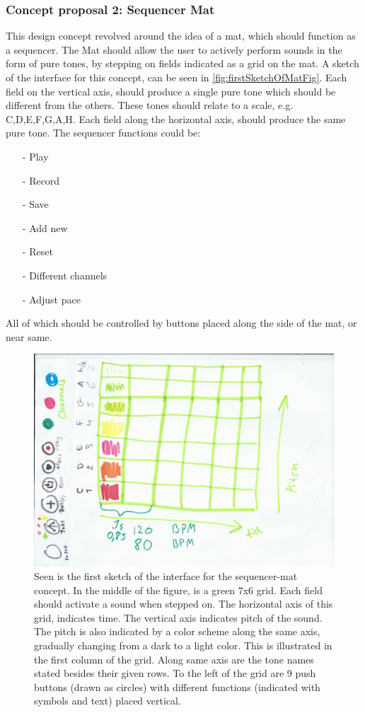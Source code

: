 \subsubsection{Concept proposal 2: Sequencer Mat}\label{sequencerMat}
This design concept revolved around the idea of a mat, which should function as a sequencer. The Mat should allow the user to actively perform sounds in the form of pure tones, by stepping on fields indicated as a grid on the mat. A sketch of the interface for this concept, can be seen in \autoref{fig:firstSketchOfMatFig}. Each field on the vertical axis, should produce a single pure tone which should be different from the others. These tones should relate to a scale, e.g. C,D,E,F,G,A,H. Each field along the horizontal axis, should produce the same pure tone. The sequencer functions could be: 
\begin{itemize}
    \item[-] Play
    \item[-] Record
    \item[-] Save
    \item[-] Add new
    \item[-] Reset
    \item[-] Different channels
    \item[-] Adjust pace
\end{itemize}
All of which should be controlled by buttons placed along the side of the mat, or near same.

\begin{figure}[H]
	\centering
	\includegraphics[width=0.9\linewidth]{figure/Design/firstSketchOfMat} 
	\caption{Seen is the first sketch of the interface for the sequencer-mat concept. In the middle of the figure, is a green 7x6 grid. Each field should activate a sound when stepped on. The horizontal axis of this grid, indicates time. The vertical axis indicates pitch of the sound. The pitch is also indicated by a color scheme along the same axis, gradually changing from a dark to a light color. This is illustrated in the first column of the grid. Along same axis are the tone names stated besides their given rows. To the left of the grid are 9 push buttons (drawn as circles) with different functions (indicated with symbols and text) placed vertical. }
	\label{fig:firstSketchOfMatFig}
\end{figure}

